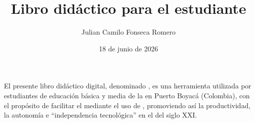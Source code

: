 \documentclass[letterpaper,10pt,spanish]{sphinxmanual}
\title{Libro didáctico para el estudiante}
\date{18 de junio de 2026}
\author{Julian Camilo Fonseca Romero}
\begin{document}
\pagestyle{empty}
\sphinxmaketitle
\pagestyle{plain}
\sphinxtableofcontents
\pagestyle{normal}
\label{\detokenize{index::doc}}


\sphinxAtStartPar
{}

\sphinxAtStartPar
El presente libro didáctico digital, denominado , es una herramienta utilizada por estudiantes de educación básica y media de la  en Puerto Boyacá (Colombia), con el propósito de facilitar el  mediante el uso de , promoviendo así la productividad, la autonomía e “independencia tecnológica” en el  del siglo XXI.
\end{document}
